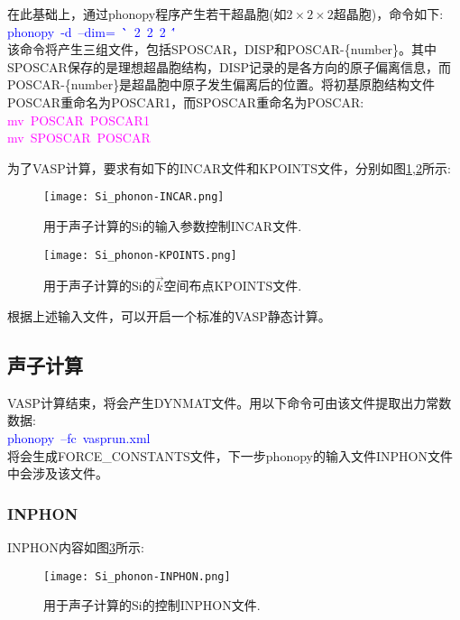 在此基础上，通过\textrm{phonopy}程序产生若干超晶胞(如$2\times2\times2$超晶胞)，命令如下:~\\
\textcolor{blue}{\textrm{phonopy~-d~--dim=~\`\`~2~2~2~\'\'}}\\
该命令将产生三组文件，包括\textrm{SPOSCAR}，\textrm{DISP}和\textrm{POSCAR}-\{\textrm{number}\}。其中\textrm{SPOSCAR}保存的是理想超晶胞结构，\textrm{DISP}记录的是各方向的原子偏离信息，而\textrm{POSCAR}-\{\textrm{number}\}是超晶胞中原子发生偏离后的位置。将初基原胞结构文件\textrm{POSCAR}重命名为\textrm{POSCAR1}，而\textrm{SPOSCAR}重命名为\textrm{POSCAR}:~\\
\textcolor{magenta}{\textrm{mv~POSCAR~POSCAR1}}\\
\textcolor{magenta}{\textrm{mv~SPOSCAR~POSCAR}}

为了\textrm{VASP}计算，要求有如下的\textrm{INCAR}文件和\textrm{KPOINTS}文件，分别如图\ref{Si_phonon-INCAR},\ref{Si_phonon-KPOINTS}所示:~
\begin{figure}[h!]
\centering
\texttt{[image: Si\_phonon-INCAR.png]}
\caption{\small \textrm{用于声子计算的\textrm{Si}的输入参数控制\textrm{INCAR}文件.}}%
\label{Si_phonon-INCAR}
\end{figure}
\begin{figure}[h!]
\centering
\vskip -20pt
\texttt{[image: Si\_phonon-KPOINTS.png]}
\caption{\small \textrm{用于声子计算的\textrm{Si}的$\vec k$空间布点\textrm{KPOINTS}文件.}}%
\label{Si_phonon-KPOINTS}
\end{figure}
根据上述输入文件，可以开启一个标准的\textrm{VASP}静态计算。
\subsection{声子计算}
\textrm{VASP}计算结束，将会产生\textrm{DYNMAT}文件。用以下命令可由该文件提取出力常数数据:\\
\textcolor{blue}{\textrm{phonopy~--fc~vasprun.xml}}\\
将会生成\textrm{FORCE\_CONSTANTS}文件，下一步\textrm{phonopy}的输入文件\textrm{INPHON}文件中会涉及该文件。
\subsubsection{\rm{INPHON}}
\textrm{INPHON}内容如图\ref{Si_phonon-INPHON}所示:~
\begin{figure}[h!]
\centering
\texttt{[image: Si\_phonon-INPHON.png]}
\caption{\small \textrm{用于声子计算的\textrm{Si}的控制\textrm{INPHON}文件.}}%
\label{Si_phonon-INPHON}
\end{figure}

